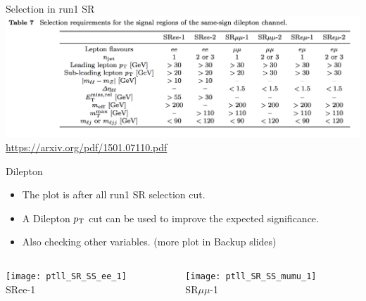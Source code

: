 \documentclass[mathserif,serif]{beamer}
\begin{document}
\begin{frame}{Selection in run1 SR}
\includegraphics[width=\textwidth]{data/photo/SRcutrun1.png} \\
\url{https://arxiv.org/pdf/1501.07110.pdf}
\end{frame}

\begin{frame}{Dilepton \pt}
\begin{itemize}
\item The plot is after all run1 SR selection cut.
\item A Dilepton $p_{\text{T}}$ cut can be used to improve the expected significance.
\item Also checking other variables. (more plot in Backup slides)
\end{itemize}

\begin{columns}

\begin{column}{0.5\textwidth}
\begin{center}
\texttt{[image: ptll\_SR\_SS\_ee\_1]} \\
SRee-1
\end{center}
\end{column}

\begin{column}{0.5\textwidth}
\begin{center}
\texttt{[image: ptll\_SR\_SS\_mumu\_1]} \\
SR$\mu\mu$-1
\end{center}
\end{column}

\end{columns}

\end{frame}
\end{document}
